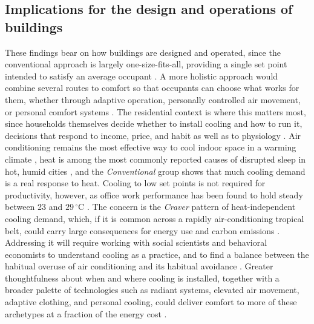 \documentclass[final,5p,times,twocolumn]{elsarticle}
\begin{document}
\subsection{Implications for the design and operations of buildings}\label{sec:implications}
These findings bear on how buildings are designed and operated, since the conventional approach is largely one-size-fits-all, providing a single set point intended to satisfy an average occupant \citep{Cheung2019-fs}.
A more holistic approach would combine several routes to comfort so that occupants can choose what works for them, whether through adaptive operation, personally controlled air movement, or personal comfort systems \citep{Dear1998-va, Schiavon2017-fx, Arakawa_Martins2022-vh}.
The residential context is where this matters most, since households themselves decide whether to install cooling and how to run it, decisions that respond to income, price, and habit as well as to physiology \citep{Davis2015-po, He2022-rg, Yun2011-nu}.
Air conditioning remains the most effective way to cool indoor space in a warming climate \citep{Lundgren-Kownacki2018-bv}, heat is among the most commonly reported causes of disrupted sleep in hot, humid cities \citep{Miller2025-ne}, and the \emph{Conventional} group shows that much cooling demand is a real response to heat.
Cooling to low set points is not required for productivity, however, as office work performance has been found to hold steady between 23 and $29\,^{\circ}$C \citep{Porras-Salazar2024-mo}.
The concern is the \emph{Craver} pattern of heat-independent cooling demand, which, if it is common across a rapidly air-conditioning tropical belt, could carry large consequences for energy use and carbon emissions \citep{Davis2015-po, Colelli2023-fy, Falchetta2024-ao, Zhang2026-cx}.
Addressing it will require working with social scientists and behavioral economists to understand cooling as a practice, and to find a balance between the habitual overuse of air conditioning and its habitual avoidance \citep{Shove2003-lf, Strengers2011-bm, Gillingham2012-nf}.
Greater thoughtfulness about when and where cooling is installed, together with a broader palette of technologies such as radiant systems, elevated air movement, adaptive clothing, and personal cooling, could deliver comfort to more of these archetypes at a fraction of the energy cost \citep{Halawa2014-ek, Schiavon2017-fx, Havenith2015-yn}.
\end{document}
